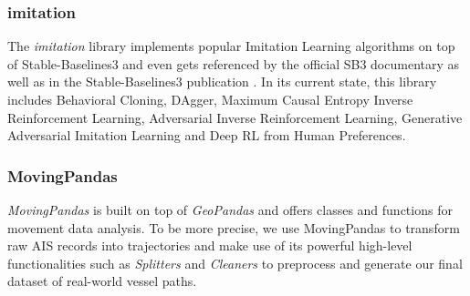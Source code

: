 \subsubsection{imitation}
The \textit{imitation} library \cite[]{wang2020imitation} implements popular Imitation Learning algorithms on top of Stable-Baselines3 and even gets referenced by the official SB3 documentary as well as in the Stable-Baselines3 publication \cite[p.~2]{stable-baselines3}. In its current state, this library includes Behavioral Cloning, DAgger, Maximum Causal Entropy Inverse Reinforcement Learning, Adversarial Inverse Reinforcement Learning, Generative Adversarial Imitation Learning and Deep RL from Human Preferences.

\subsubsection{MovingPandas}\label{subchap:movingPandas}
\textit{MovingPandas} \cite[]{graser2019movingpandas} is built on top of \textit{GeoPandas} \cite[]{kelsey_jordahl_2020_3946761} and offers classes and functions for movement data analysis. To be more precise, we use MovingPandas to transform raw AIS records into trajectories and make use of its powerful high-level functionalities such as \textit{Splitters} and \textit{Cleaners} to preprocess and generate our final dataset of real-world vessel paths.